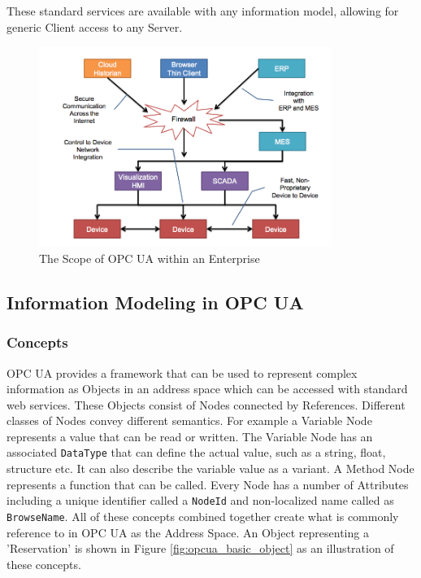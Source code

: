 \documentclass{mtconnect}	%
\begin{document}
These standard services are available with any information model, allowing for generic Client access to any Server.

\begin{figure}[h]
  \centering
  \includegraphics[width=0.85\textwidth]{diagrams/ScopeOfOpcUAEnt.png}
  \caption{The Scope of OPC UA within an Enterprise }
  \label{fig:scope_of_opcua}
\end{figure}

\subsection{Information Modeling in OPC UA}

\subsubsection{Concepts}

OPC UA provides a framework that can be used to represent complex information as Objects in an address space which can be accessed with standard web services. These Objects consist of Nodes connected by References. Different classes of Nodes convey different semantics. For example a Variable Node represents a value that can be read or written. The Variable Node has an associated \texttt{DataType} that can define the actual value, such as a string, float, structure etc. It can also describe the variable value as a variant. A Method Node represents a function that can be called. Every Node has a number of Attributes including a unique identifier called a \texttt{NodeId} and non-localized name called as \texttt{BrowseName}. All of these concepts combined together create what is commonly reference to in OPC UA as the Address Space. An Object representing a 'Reservation' is shown in Figure \ref{fig:opcua_basic_object} as an illustration of these concepts.
\end{document}
